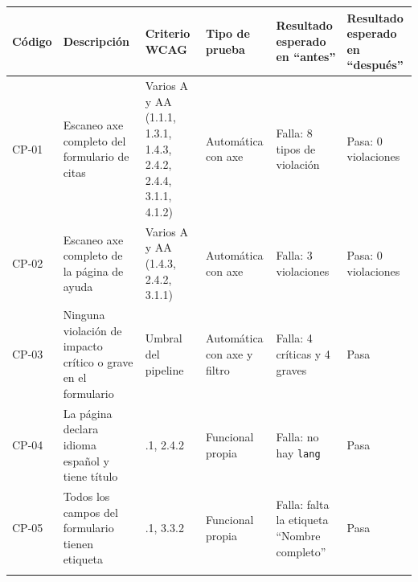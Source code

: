 \documentclass[10pt,letterpaper,onecolumn]{IEEEtran}
\newcommand{\filafina}{\arrayrulecolor{black!30}\specialrule{0.3pt}{1.5pt}{1.5pt}\arrayrulecolor{black}}
\begin{document}
\begin{longtable}[]{@{}
  >{\raggedright\arraybackslash}p{0.1081\dimexpr\linewidth-10\tabcolsep\relax}
  >{\raggedright\arraybackslash}p{0.2568\dimexpr\linewidth-10\tabcolsep\relax}
  >{\raggedright\arraybackslash}p{0.1351\dimexpr\linewidth-10\tabcolsep\relax}
  >{\raggedright\arraybackslash}p{0.1622\dimexpr\linewidth-10\tabcolsep\relax}
  >{\raggedright\arraybackslash}p{0.1892\dimexpr\linewidth-10\tabcolsep\relax}
  >{\raggedright\arraybackslash}p{0.1486\dimexpr\linewidth-10\tabcolsep\relax}@{}}
\toprule\noalign{}
\begin{minipage}[b]{\linewidth}\raggedright
Código
\end{minipage} & \begin{minipage}[b]{\linewidth}\raggedright
Descripción
\end{minipage} & \begin{minipage}[b]{\linewidth}\raggedright
Criterio WCAG
\end{minipage} & \begin{minipage}[b]{\linewidth}\raggedright
Tipo de prueba
\end{minipage} & \begin{minipage}[b]{\linewidth}\raggedright
Resultado esperado en ``antes''
\end{minipage} & \begin{minipage}[b]{\linewidth}\raggedright
Resultado esperado en ``después''
\end{minipage} \\
\midrule\noalign{}
\endhead
\bottomrule\noalign{}
\endlastfoot
CP-01 & Escaneo axe completo del formulario de citas & Varios A y AA (1.1.1, 1.3.1, 1.4.3, 2.4.2, 2.4.4, 3.1.1, 4.1.2) & Automática con axe & Falla: 8 tipos de violación & Pasa: 0 violaciones \\ \filafina
CP-02 & Escaneo axe completo de la página de ayuda & Varios A y AA (1.4.3, 2.4.2, 3.1.1) & Automática con axe & Falla: 3 violaciones & Pasa: 0 violaciones \\ \filafina
CP-03 & Ninguna violación de impacto crítico o grave en el formulario & Umbral del pipeline & Automática con axe y filtro & Falla: 4 críticas y 4 graves & Pasa \\ \filafina
CP-04 & La página declara idioma español y tiene título & 3.1.1, 2.4.2 & Funcional propia & Falla: no hay \texttt{lang} & Pasa \\ \filafina
CP-05 & Todos los campos del formulario tienen etiqueta & 1.3.1, 3.3.2 & Funcional propia & Falla: falta la etiqueta ``Nombre completo'' & Pasa \\ \filafina

\end{longtable}
\end{document}
